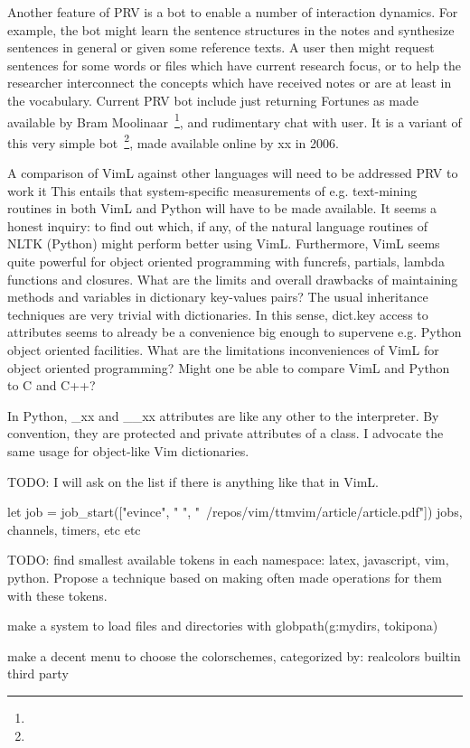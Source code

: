 \documentclass{article}
\begin{document}
Another feature of PRV is a bot to enable a number of interaction
dynamics.
For example, the bot might learn the sentence structures in the
notes and synthesize sentences in general or given some reference
texts.
A user then might request sentences for some words or files which
have current research focus, or to help the researcher interconnect
the concepts which have received notes or are at least in the
vocabulary.
Current PRV bot include just returning Fortunes as made available by
Bram Moolinaar~\footnote{},
and rudimentary chat with user.
It is a variant of this very simple bot~\footnote{}, made available
online by xx in 2006.

A comparison of VimL against other languages
will need to be addressed PRV to work it 
This entails that system-specific measurements of 
e.g. text-mining routines in both VimL and Python
will have to be made available.
It seems a honest inquiry: to find out which, if any,
of the natural language routines of NLTK (Python)
might perform better using VimL.
Furthermore,
VimL seems quite powerful for object oriented
programming with funcrefs, partials, lambda functions and closures.
What are the limits and overall drawbacks of maintaining
methods and variables in dictionary key-values pairs?
The usual inheritance techniques are very trivial with dictionaries.
In this sense, dict.key access to attributes
seems to already be a convenience big enough to
supervene e.g. Python object oriented facilities.
What are the limitations inconveniences 
of VimL for object oriented programming?
Might one be able to compare VimL and Python to
C and C++?

In Python, \_xx and \_\_xx attributes are like
any other to the interpreter.
By convention, they are protected and private attributes of a class.
I advocate the same usage for object-like Vim dictionaries.

TODO: I will ask on the list if there is anything like that in VimL.

let job = job\_start(["evince", " ", "~/repos/vim/ttmvim/article/article.pdf"]) 
jobs, channels, timers, etc etc


TODO:
find smallest available tokens in each namespace:
latex, javascript, vim, python.
Propose a technique based on making often made operations
for them with these tokens.

make a system to load files and directories with
globpath(g:mydirs, tokipona)

make a decent menu to choose the colorschemes, categorized by:
realcolors
builtin
third party
\end{document}
